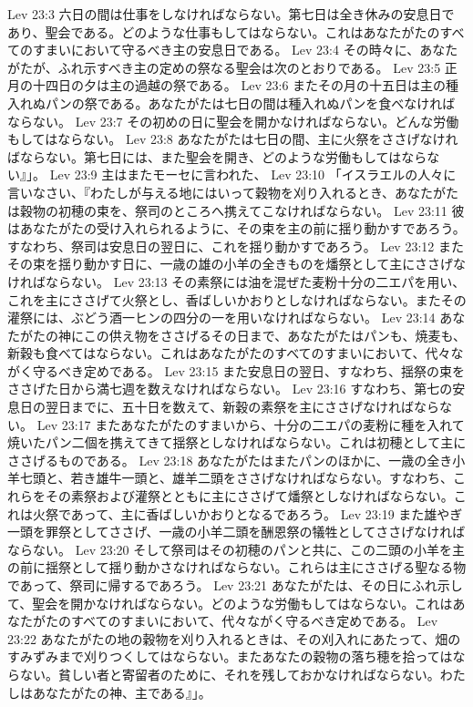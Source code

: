 Lev 23:3  六日の間は仕事をしなければならない。第七日は全き休みの安息日であり、聖会である。どのような仕事もしてはならない。これはあなたがたのすべてのすまいにおいて守るべき主の安息日である。
Lev 23:4  その時々に、あなたがたが、ふれ示すべき主の定めの祭なる聖会は次のとおりである。
Lev 23:5  正月の十四日の夕は主の過越の祭である。
Lev 23:6  またその月の十五日は主の種入れぬパンの祭である。あなたがたは七日の間は種入れぬパンを食べなければならない。
Lev 23:7  その初めの日に聖会を開かなければならない。どんな労働もしてはならない。
Lev 23:8  あなたがたは七日の間、主に火祭をささげなければならない。第七日には、また聖会を開き、どのような労働もしてはならない』」。
Lev 23:9  主はまたモーセに言われた、
Lev 23:10  「イスラエルの人々に言いなさい、『わたしが与える地にはいって穀物を刈り入れるとき、あなたがたは穀物の初穂の束を、祭司のところへ携えてこなければならない。
Lev 23:11  彼はあなたがたの受け入れられるように、その束を主の前に揺り動かすであろう。すなわち、祭司は安息日の翌日に、これを揺り動かすであろう。
Lev 23:12  またその束を揺り動かす日に、一歳の雄の小羊の全きものを燔祭として主にささげなければならない。
Lev 23:13  その素祭には油を混ぜた麦粉十分の二エパを用い、これを主にささげて火祭とし、香ばしいかおりとしなければならない。またその灌祭には、ぶどう酒一ヒンの四分の一を用いなければならない。
Lev 23:14  あなたがたの神にこの供え物をささげるその日まで、あなたがたはパンも、焼麦も、新穀も食べてはならない。これはあなたがたのすべてのすまいにおいて、代々ながく守るべき定めである。
Lev 23:15  また安息日の翌日、すなわち、揺祭の束をささげた日から満七週を数えなければならない。
Lev 23:16  すなわち、第七の安息日の翌日までに、五十日を数えて、新穀の素祭を主にささげなければならない。
Lev 23:17  またあなたがたのすまいから、十分の二エパの麦粉に種を入れて焼いたパン二個を携えてきて揺祭としなければならない。これは初穂として主にささげるものである。
Lev 23:18  あなたがたはまたパンのほかに、一歳の全き小羊七頭と、若き雄牛一頭と、雄羊二頭をささげなければならない。すなわち、これらをその素祭および灌祭とともに主にささげて燔祭としなければならない。これは火祭であって、主に香ばしいかおりとなるであろう。
Lev 23:19  また雄やぎ一頭を罪祭としてささげ、一歳の小羊二頭を酬恩祭の犠牲としてささげなければならない。
Lev 23:20  そして祭司はその初穂のパンと共に、この二頭の小羊を主の前に揺祭として揺り動かさなければならない。これらは主にささげる聖なる物であって、祭司に帰するであろう。
Lev 23:21  あなたがたは、その日にふれ示して、聖会を開かなければならない。どのような労働もしてはならない。これはあなたがたのすべてのすまいにおいて、代々ながく守るべき定めである。
Lev 23:22  あなたがたの地の穀物を刈り入れるときは、その刈入れにあたって、畑のすみずみまで刈りつくしてはならない。またあなたの穀物の落ち穂を拾ってはならない。貧しい者と寄留者のために、それを残しておかなければならない。わたしはあなたがたの神、主である』」。
